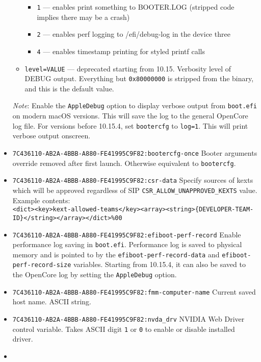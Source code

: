 \documentclass[]{article}
\begin{document}
\begin{itemize}
\begin{itemize}
\begin{itemize}
  \item \texttt{1} --- enables print something to BOOTER.LOG (stripped code implies there
  may be a crash)
  \item \texttt{2} --- enables perf logging to /efi/debug-log in the device three
  \item \texttt{4} --- enables timestamp printing for styled printf calls
  \end{itemize}
  \item \texttt{level=VALUE}  --- deprecated starting from 10.15. Verbosity level of
  DEBUG output. Everything but \texttt{0x80000000} is stripped from the binary,
  and this is the default value.
  \end{itemize}

  \emph{Note}: Enable the \texttt{AppleDebug} option to display verbose output from \texttt{boot.efi}
  on modern macOS versions. This will save the log to the general OpenCore log file. For versions before
  10.15.4, set \texttt{bootercfg} to \texttt{log=1}. This will print verbose output onscreen.
\item \texttt{7C436110-AB2A-4BBB-A880-FE41995C9F82:bootercfg-once}
  \break
  Booter arguments override removed after first launch. Otherwise equivalent to \texttt{bootercfg}.
\item \texttt{7C436110-AB2A-4BBB-A880-FE41995C9F82:csr-data}
  \break
  Specify sources of kexts which will be approved regardless of SIP \texttt{CSR\_ALLOW\_UNAPPROVED\_KEXTS} value.\\
  Example contents:\\
  \texttt{<dict><key>kext-allowed-teams</key><array><string>\{DEVELOPER-TEAM-ID\}</string></array></dict>\%00}
\item
  \texttt{7C436110-AB2A-4BBB-A880-FE41995C9F82:efiboot-perf-record}
  \break
  Enable performance log saving in \texttt{boot.efi}. Performance log is saved to physical
  memory and is pointed to by the \texttt{efiboot-perf-record-data} and \texttt{efiboot-perf-record-size}
  variables. Starting from 10.15.4, it can also be saved to the OpenCore log by setting the
  \texttt{AppleDebug} option.
\item
  \texttt{7C436110-AB2A-4BBB-A880-FE41995C9F82:fmm-computer-name}
  \break
  Current saved host name. ASCII string.
\item
  \texttt{7C436110-AB2A-4BBB-A880-FE41995C9F82:nvda\_drv}
  \break
  NVIDIA Web Driver control variable. Takes ASCII digit \texttt{1} or \texttt{0}
  to enable or disable installed driver.
\item

\end{itemize}
\end{document}
